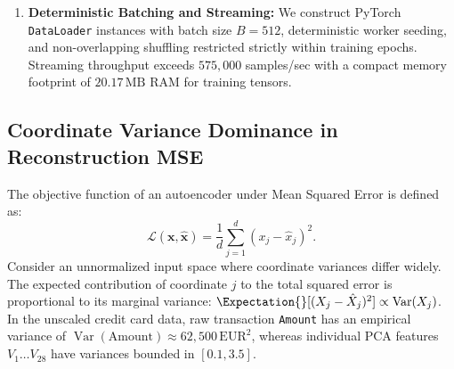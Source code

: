 \begin{enumerate}
    \item \textbf{Deterministic Batching and Streaming:} We construct PyTorch \texttt{DataLoader} instances with batch size $B=512$, deterministic worker seeding, and non-overlapping shuffling restricted strictly within training epochs. Streaming throughput exceeds $575,000$ samples/sec with a compact memory footprint of $20.17\,\text{MB}$ RAM for training tensors.
\end{enumerate}

\begin{table}[t]
\caption{Phase 2 Deep Learning Pipeline Anti-Leakage Audit}
\label{tab:p2_leakage_audit}
\centering
\footnotesize
{}
\end{table}

\subsection{Coordinate Variance Dominance in Reconstruction MSE}
The objective function of an autoencoder under Mean Squared Error is defined as:
\begin{equation}
    \mathcal{L}(\mathbf{x}, \hat{\mathbf{x}}) = \frac{1}{d} \sum_{j=1}^d (x_j - \hat{x}_j)^2.
\end{equation}
Consider an unnormalized input space where coordinate variances differ widely. The expected contribution of coordinate $j$ to the total squared error is proportional to its marginal variance: $\Expectation{}[(X_j - \hat{X}_j)^2] \propto \operatorname{Var}(X_j)$. In the unscaled credit card data, raw transaction \texttt{Amount} has an empirical variance of $\operatorname{Var}(\text{Amount}) \approx 62,500\,\text{EUR}^2$, whereas individual PCA features $V_1 \dots V_{28}$ have variances bounded in $[0.1, 3.5]$.

